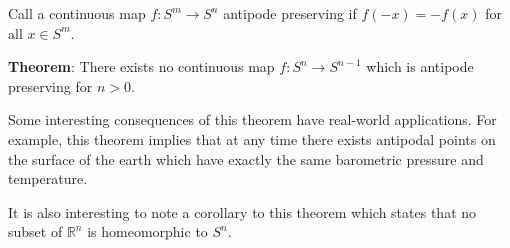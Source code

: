 \documentclass[12pt]{article}
\begin{document}
Call a continuous map $f:S^m \to S^n$ antipode preserving if $f(-x)=-f(x)$ for all $x \in S^{m}$. 

\textbf{Theorem}: There exists no continuous map $f:S^{n} \to S^{n-1}$ which is antipode preserving for $n>0$.

Some interesting consequences of this theorem have real-world applications. For example, this theorem implies that at any time there exists antipodal points on the surface of the earth which have exactly the same barometric pressure and temperature.

It is also interesting to note a corollary to this theorem which states that no subset of $\mathbb{R}^{n}$ is homeomorphic to $S^{n}$.
\end{document}

